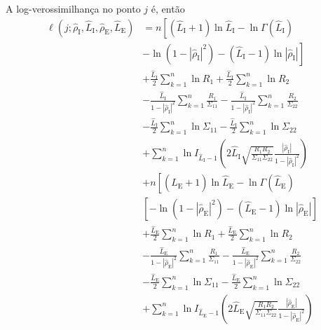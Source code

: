 \documentclass[journal]{IEEEtran}
\begin{document}
A log-verossimilhança no ponto $j$ é, então
\begin{equation}\label{eq:TotalLogLikelihood}
\begin{split}
\ell(j;\widehat{\rho}_\text{I}, \widehat{L}_\text{I}, \widehat{\rho}_\text{E}, \widehat{L}_\text{E})&=n\left[(\widehat{L}_\text{I}+1)\ln \widehat{L}_\text{I} - \ln\Gamma(\widehat{L}_\text{I})\right.\\
                        &- \left.\ln(1-|\widehat{\rho}_\text{I}|^2)-(\widehat{L}_\text{I}-1)\ln|\widehat{\rho}_\text{I}|\right] \\
                        &+\frac{\widehat{L}_\text{I}}{2}\sum_{k=1}^{n} \ln R_1 +\frac{\widehat{L}_\text{I}}{2} \sum_{k=1}^{n}\ln R_2\\
                        &-\frac{\widehat{L}_\text{I}}{1-|\widehat{\rho}_\text{I}|^2}\sum_{k=1}^{n}\frac{R_1}{\Sigma_{11}}-\frac{\widehat{L}_\text{I}}{1-|\widehat{\rho}_\text{I}|^2}\sum_{k=1}^{n}\frac{R_2}{\Sigma_{22}}\\
	&-\frac{\widehat{L}_\text{I}}{2}\sum_{k=1}^{n}\ln\Sigma_{11}-\frac{\widehat{L}_\text{I}}{2}\sum_{k=1}^{n}\ln\Sigma_{22} \\
	&+\sum_{k=1}^{n}\ln I_{\widehat{L}_\text{I}-1}\left(2\widehat{L}_\text{I}\sqrt{\frac{R_1R_2}{\Sigma_{11}\Sigma_{22}}}\frac{|\widehat{\rho}_\text{I}|}{1-|\widehat{\rho}_\text{I}|^2}\right)\\
	&+n\left[(\widehat{L}_\text{E}+1)\ln \widehat{L}_\text{E} - \ln\Gamma(\widehat{L}_\text{E})\right.\\
	                    & \left[- \ln(1-|\widehat{\rho}_\text{E}|^2)-(\widehat{L}_\text{E}-1)\ln|\widehat{\rho}_\text{E}|\right] \\
                        &+\frac{\widehat{L}_\text{E}}{2}\sum_{k=1}^{n} \ln R_1 +\frac{\widehat{L}_\text{E}}{2} \sum_{k=1}^{n}\ln R_2\\
                        &-\frac{\widehat{L}_\text{E}}{1-|\widehat{\rho}_\text{E}|^2}\sum_{k=1}^{n}\frac{R_1}{\Sigma_{11}}-\frac{\widehat{L}_\text{E}}{1-|\widehat{\rho}_\text{E}|^2}\sum_{k=1}^{n}\frac{R_2}{\Sigma_{22}}\\
	&-\frac{\widehat{L}_\text{E}}{2}\sum_{k=1}^{n}\ln\Sigma_{11}-\frac{\widehat{L}_\text{E}}{2}\sum_{k=1}^{n}\ln\Sigma_{22} \\
	&+\sum_{k=1}^{n}\ln I_{\widehat{L}_\text{E}-1}\left(2\widehat{L}_\text{E}\sqrt{\frac{R_1R_2}{\Sigma_{11}\Sigma_{22}}}\frac{|\widehat{\rho}_\text{E}|}{1-|\widehat{\rho}_\text{E}|^2}\right)
\end{split}
\end{equation}
\end{document}
